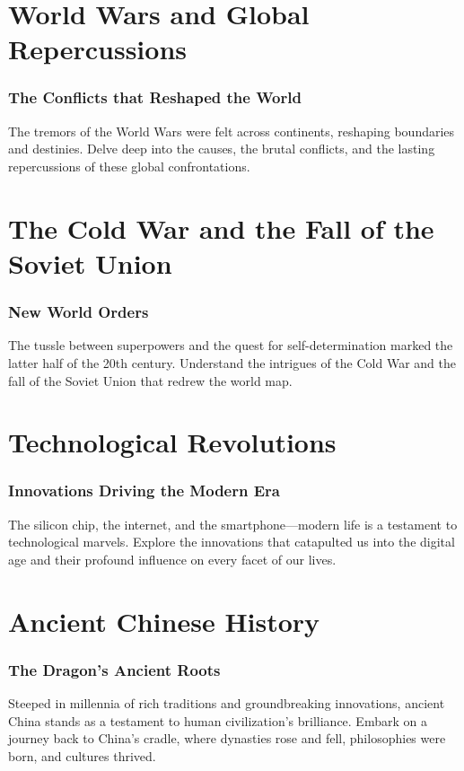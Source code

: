 \documentclass[a4paper,12pt]{book}
\begin{document}
\chapter{World Wars and Global Repercussions}
\subsection*{The Conflicts that Reshaped the World}
The tremors of the World Wars were felt across continents, reshaping boundaries and destinies. Delve deep into the causes, the brutal conflicts, and the lasting repercussions of these global confrontations.

\chapter{The Cold War and the Fall of the Soviet Union}
\subsection*{New World Orders}
The tussle between superpowers and the quest for self-determination marked the latter half of the 20th century. Understand the intrigues of the Cold War and the fall of the Soviet Union that redrew the world map.

\chapter{Technological Revolutions}
\subsection*{Innovations Driving the Modern Era}
The silicon chip, the internet, and the smartphone—modern life is a testament to technological marvels. Explore the innovations that catapulted us into the digital age and their profound influence on every facet of our lives.

\chapter{Ancient Chinese History}
\subsection*{The Dragon's Ancient Roots}
Steeped in millennia of rich traditions and groundbreaking innovations, ancient China stands as a testament to human civilization's brilliance. Embark on a journey back to China's cradle, where dynasties rose and fell, philosophies were born, and cultures thrived.
\end{document}
